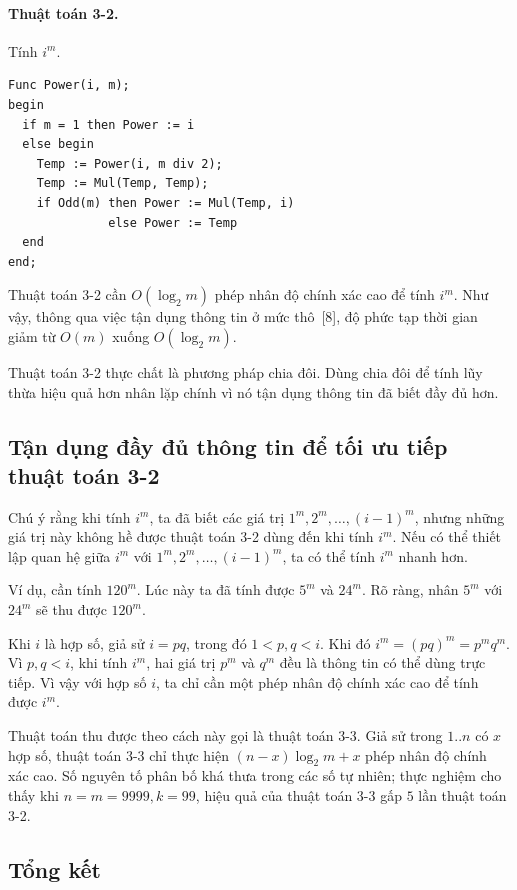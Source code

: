 \documentclass[11pt]{article}
\begin{document}
\paragraph{Thuật toán 3-2.} Tính \(i^m\).
\begin{verbatim}
Func Power(i, m);
begin
  if m = 1 then Power := i
  else begin
    Temp := Power(i, m div 2);
    Temp := Mul(Temp, Temp);
    if Odd(m) then Power := Mul(Temp, i)
              else Power := Temp
  end
end;
\end{verbatim}

Thuật toán 3-2 cần \(O(\log_2 m)\) phép nhân độ chính xác cao để tính \(i^m\).
Như vậy, thông qua việc tận dụng thông tin ở mức thô~[8], độ phức tạp thời
gian giảm từ \(O(m)\) xuống \(O(\log_2 m)\).

Thuật toán 3-2 thực chất là phương pháp chia đôi. Dùng chia đôi để tính lũy
thừa hiệu quả hơn nhân lặp chính vì nó tận dụng thông tin đã biết đầy đủ hơn.

\subsection{Tận dụng đầy đủ thông tin để tối ưu tiếp thuật toán 3-2}

Chú ý rằng khi tính \(i^m\), ta đã biết các giá trị
\(1^m,2^m,\ldots,(i-1)^m\), nhưng những giá trị này không hề được thuật toán
3-2 dùng đến khi tính \(i^m\). Nếu có thể thiết lập quan hệ giữa \(i^m\) với
\(1^m,2^m,\ldots,(i-1)^m\), ta có thể tính \(i^m\) nhanh hơn.

Ví dụ, cần tính \(120^m\). Lúc này ta đã tính được \(5^m\) và \(24^m\). Rõ
ràng, nhân \(5^m\) với \(24^m\) sẽ thu được \(120^m\).

Khi \(i\) là hợp số, giả sử \(i=pq\), trong đó \(1<p,q<i\). Khi đó
\(i^m=(pq)^m=p^mq^m\). Vì \(p,q<i\), khi tính \(i^m\), hai giá trị \(p^m\) và
\(q^m\) đều là thông tin có thể dùng trực tiếp. Vì vậy với hợp số \(i\), ta
chỉ cần một phép nhân độ chính xác cao để tính được \(i^m\).

Thuật toán thu được theo cách này gọi là thuật toán 3-3. Giả sử trong
\(1..n\) có \(x\) hợp số, thuật toán 3-3 chỉ thực hiện
\((n-x)\log_2 m+x\) phép nhân độ chính xác cao. Số nguyên tố phân bố khá thưa
trong các số tự nhiên; thực nghiệm cho thấy khi \(n=m=9999,k=99\), hiệu quả
của thuật toán 3-3 gấp \(5\) lần thuật toán 3-2.

\subsection{Tổng kết}
\end{document}
